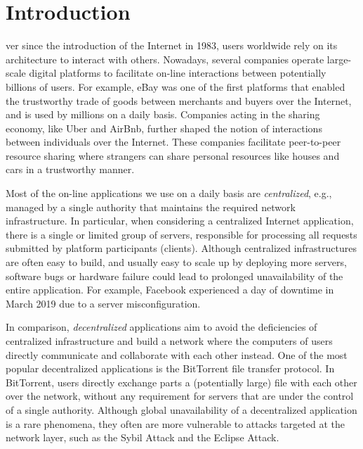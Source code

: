 \chapter{Introduction}
\label{introduction}


ver since the introduction of the Internet in 1983, users worldwide rely on its architecture to interact with others.
Nowadays, several companies operate large-scale digital platforms to facilitate on-line interactions between potentially billions of users.
For example, eBay was one of the first platforms that enabled the trustworthy trade of goods between merchants and buyers over the Internet, and is used by millions on a daily basis.
Companies acting in the sharing economy, like Uber and AirBnb, further shaped the notion of interactions between individuals over the Internet.
These companies facilitate peer-to-peer resource sharing where strangers can share personal resources like houses and cars in a trustworthy manner.

Most of the on-line applications we use on a daily basis are \emph{centralized}, e.g., managed by a single authority that maintains the required network infrastructure. %
In particular, when considering a centralized Internet application, there is a single or limited group of servers, responsible for processing all requests submitted by platform participants (clients).
Although centralized infrastructures are often easy to build, and usually easy to scale up by deploying more servers, software bugs or hardware failure could lead to prolonged unavailability of the entire application.
For example, Facebook experienced a day of downtime in March 2019 due to a server misconfiguration.

In comparison, \emph{decentralized} applications aim to avoid the deficiencies of centralized infrastructure and build a network where the computers of users directly communicate and collaborate with each other instead.
One of the most popular decentralized applications is the BitTorrent file transfer protocol.
In BitTorrent, users directly exchange parts a (potentially large) file with each other over the network, without any requirement for servers that are under the control of a single authority.
Although global unavailability of a decentralized application is a rare phenomena, they often are more vulnerable to attacks targeted at the network layer, such as the Sybil Attack and the Eclipse Attack.

